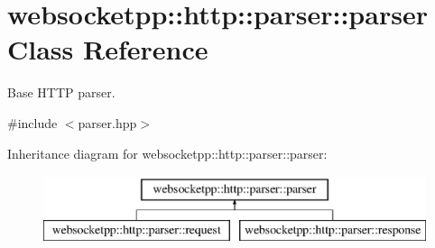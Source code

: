 \hypertarget{classwebsocketpp_1_1http_1_1parser_1_1parser}{}\section{websocketpp\+:\+:http\+:\+:parser\+:\+:parser Class Reference}
\label{classwebsocketpp_1_1http_1_1parser_1_1parser}


Base H\+T\+TP parser.  




{\ttfamily \#include $<$parser.\+hpp$>$}

Inheritance diagram for websocketpp\+:\+:http\+:\+:parser\+:\+:parser\+:\begin{figure}[H]
\begin{center}
\leavevmode
\includegraphics[height=2.000000cm]{classwebsocketpp_1_1http_1_1parser_1_1parser}
\end{center}
\end{figure}
